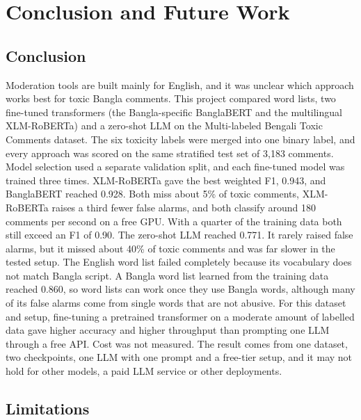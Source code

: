 \chapter{Conclusion and Future Work}
\justifying

\section{Conclusion}

Moderation tools are built mainly for English, and it was unclear which approach works best for toxic Bangla comments. This project compared word lists, two fine-tuned transformers (the Bangla-specific BanglaBERT and the multilingual XLM-RoBERTa) and a zero-shot LLM on the Multi-labeled Bengali Toxic Comments dataset. The six toxicity labels were merged into one binary label, and every approach was scored on the same stratified test set of 3,183 comments. Model selection used a separate validation split, and each fine-tuned model was trained three times. XLM-RoBERTa gave the best weighted F1, 0.943, and BanglaBERT reached 0.928. Both miss about 5\% of toxic comments, XLM-RoBERTa raises a third fewer false alarms, and both classify around 180 comments per second on a free GPU. With a quarter of the training data both still exceed an F1 of 0.90. The zero-shot LLM reached 0.771. It rarely raised false alarms, but it missed about 40\% of toxic comments and was far slower in the tested setup. The English word list failed completely because its vocabulary does not match Bangla script. A Bangla word list learned from the training data reached 0.860, so word lists can work once they use Bangla words, although many of its false alarms come from single words that are not abusive. For this dataset and setup, fine-tuning a pretrained transformer on a moderate amount of labelled data gave higher accuracy and higher throughput than prompting one LLM through a free API. Cost was not measured. The result comes from one dataset, two checkpoints, one LLM with one prompt and a free-tier setup, and it may not hold for other models, a paid LLM service or other deployments.

\section{Limitations}

